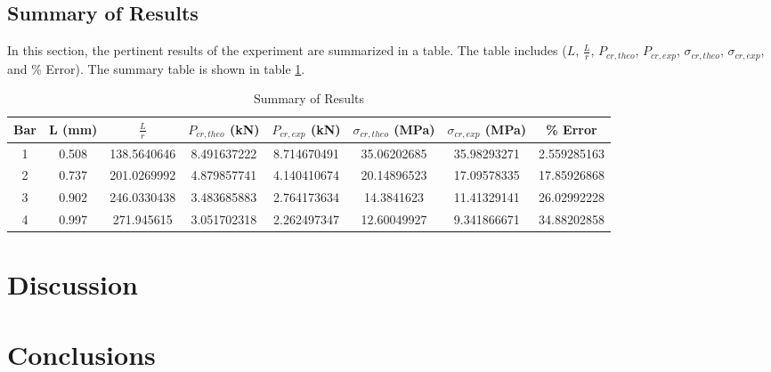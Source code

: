 \documentclass[12pt, titlepage]{article}
\begin{document}
\subsection{Summary of Results}
In this section, the pertinent results of the experiment are summarized in
a table. The table includes ($L$, $\frac{L}{r}$, $P_{cr,theo}$, $P_{cr,exp}$,
$\sigma_{cr,theo}$, $\sigma_{cr,exp}$, and \% Error). The summary table is
shown in table \ref{tab:summary}.
\begin{table}[H]
    \centering
    \caption{Summary of Results}
    \label{tab:summary}
    \begin{adjustwidth}{-1in}{-1in}
        \begin{tabular}{|c|c|c|c|c|c|c|c|}
            \hline
            \textbf{Bar} & \textbf{L (mm)} & \textbf{$\frac{L}{r}$} & \textbf{$P_{cr,theo}$ (kN)} & \textbf{$P_{cr,exp}$ (kN)} & \textbf{$\sigma_{cr,theo}$ (MPa)} & \textbf{$\sigma_{cr,exp}$ (MPa)} & \textbf{\% Error}\\
            \hline
            1 & 0.508 & 138.5640646 & 8.491637222 & 8.714670491 & 35.06202685 & 35.98293271 & 2.559285163 \\
            \hline
            2 & 0.737 & 201.0269992 & 4.879857741 & 4.140410674 & 20.14896523 & 17.09578335 & 17.85926868 \\
            \hline
            3 & 0.902 & 246.0330438 & 3.483685883 & 2.764173634 & 14.3841623 & 11.41329141 & 26.02992228 \\
            \hline
            4 & 0.997 & 271.945615 & 3.051702318 & 2.262497347 & 12.60049927 & 9.341866671 & 34.88202858 \\
            \hline
        \end{tabular}
    \end{adjustwidth}
\end{table}
\newpage
\section{Discussion}
\newpage
\section{Conclusions}
\end{document}
